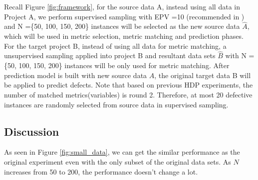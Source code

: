 Recall Figure \ref{fig:framework}, for the source data A, instead using all data in Project A, we perform supervised sampling with EPV =10 (recommended in \cite{peduzzi1996simulation})  and N =\{50, 100, 150, 200\} instances will be selected as the new source data ${\hat A}$, which will be used in metric selection, metric matching and prediction phases. For the target project B, instead of using all data for metric matching, a unsupervised sampling applied into project B and resultant data sets ${\hat B}$ with N = \{50, 100, 150, 200\} instances will be only used for metric matching. After prediction model is built with new source data $\hat A$, the original target data B will be applied to predict defects. Note that based on previous HDP experiments, the number of matched metrics(variables) is round 2. Therefore, at most 20 defective instances are randomly selected from source data in supervised sampling.

\subsection{Discussion}
As seen in Figure \ref{fig:small_data}, we can get the similar performance as the original experiment even with the only subset of the original data sets. As $N$ increases from 50 to 200, the performance doesn't change a lot.


